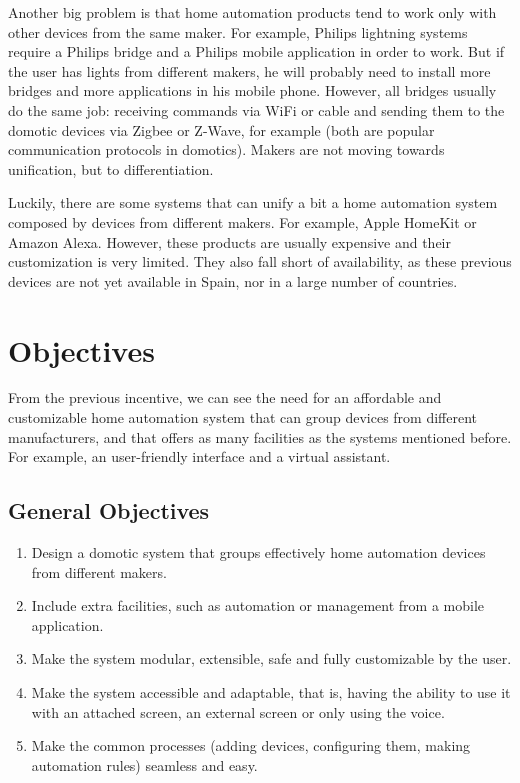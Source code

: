 Another big problem is that home automation products tend to work only with other devices from the same maker. For example, Philips
lightning systems require a Philips bridge and a Philips mobile application in order to work. But if the user has lights from different 
makers, he will probably need to install more bridges and more applications in his mobile phone. However, all bridges usually do the same
job: receiving commands via WiFi or cable and sending them to the domotic devices via Zigbee or Z-Wave, for example (both are popular
communication protocols in domotics). Makers are not moving towards unification, but to differentiation.

Luckily, there are some systems that can unify a bit a home automation system composed by devices from different makers. For example,
Apple HomeKit or Amazon Alexa. However, these products are usually expensive and their customization is very limited. They also fall short 
of availability, as these previous devices are not yet available in Spain, nor in a large number of countries.

\section{Objectives}
From the previous incentive, we can see the need for an affordable and customizable home automation system that can group devices
from different manufacturers, and that offers as many facilities as the systems mentioned before. For example, an user-friendly 
interface and a virtual assistant.

\subsection{General Objectives}
\begin{enumerate}
	\item Design a domotic system that groups effectively home automation devices from different makers.
	\item Include extra facilities, such as automation or management from a mobile application.
	\item Make the system modular, extensible, safe and fully customizable by the user.
	\item Make the system accessible and adaptable, that is, having the ability to use it with an attached screen, an external 
	screen or only using the voice.
	\item Make the common processes (adding devices, configuring them, making automation rules) seamless and easy.
\end{enumerate}

